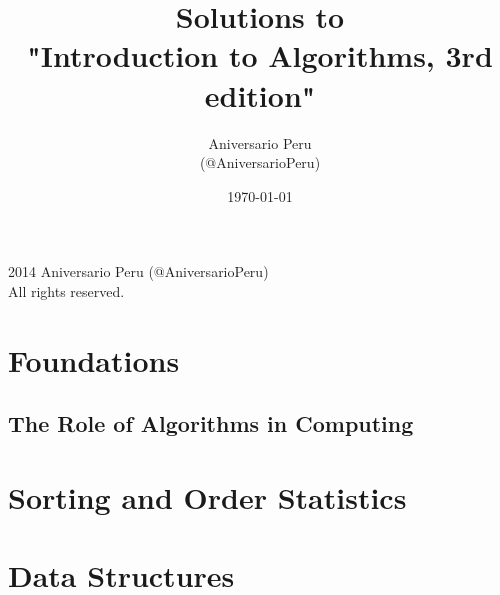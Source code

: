\documentclass[11pt]{book}
\title{Solutions to\\"Introduction to Algorithms, 3rd edition"}
\author{Aniversario Peru\\(@AniversarioPeru)}
\date{\today}
\begin{document}
\frontmatter
\maketitle


\noindent\textcopyright{} 2014 Aniversario Peru (@AniversarioPeru)\\
All rights reserved.\\


\part{Foundations}

\chapter{The Role of Algorithms in Computing}



\part{Sorting and Order Statistics}

\part{Data Structures}

\backmatter

\listoffigures
\listoftables
\end{document}
